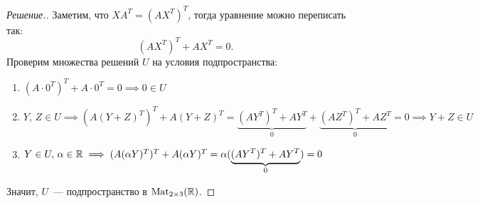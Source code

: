 \documentclass[a4paper]{article}
\newcommand{\Mat}{\operatorname{Mat}}
\theoremstyle{remark}
\begin{document}
	    \begin{proof}[Решение.]
        Заметим, что $XA^T = (AX^T)^T$, тогда уравнение можно переписать так:
        \begin{equation*}
          (AX^T)^T + AX^T = 0.
        \end{equation*}
        Проверим множества решений $U$ на условия подпространства:
        \begin{enumerate}
          \item $(A \cdot 0^T)^T + A \cdot 0^T = 0 \implies 0 \in U$
          \item $Y,\, Z \in U \implies (A(Y + Z)^T)^T + A(Y + Z)^T = \underbrace{(AY^T)^T + AY^T}_0 + \underbrace{(AZ^T)^T + AZ^T}_0 = 0 \implies Y+Z \in U$
          \item $Y \in U,\, \alpha \in \mathbb{R} \implies (A(\alpha Y)^T)^T + A (\alpha Y)^T = \alpha (\underbrace{(AY^T)^T + AY^T}_0) = 0$
        \end{enumerate}
        Значит, $U$~--- подпространство в $\Mat_{2\times 3}(\RR)$.


\end{proof}
\end{document}

